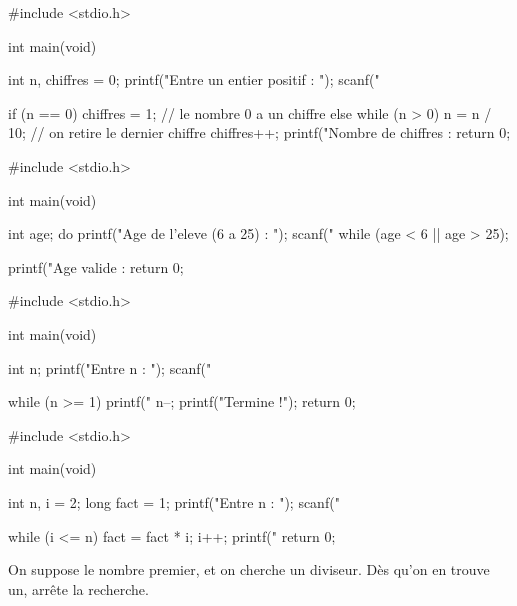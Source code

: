 \begin{codec}
#include <stdio.h>

int main(void) {
    int n, chiffres = 0;
    printf("Entre un entier positif : ");
    scanf("%

    if (n == 0) {
        chiffres = 1;        // le nombre 0 a un chiffre
    } else {
        while (n > 0) {
            n = n / 10;      // on retire le dernier chiffre
            chiffres++;
        }
    }
    printf("Nombre de chiffres : %
    return 0;
}
\end{codec}

\begin{codec}
#include <stdio.h>

int main(void) {
    int age;
    do {
        printf("Age de l'eleve (6 a 25) : ");
        scanf("%
    } while (age < 6 || age > 25);

    printf("Age valide : %
    return 0;
}
\end{codec}

\begin{codec}
#include <stdio.h>

int main(void) {
    int n;
    printf("Entre n : ");
    scanf("%

    while (n >= 1) {
        printf("%
        n--;
    }
    printf("Termine !\n");
    return 0;
}
\end{codec}

\begin{codec}
#include <stdio.h>

int main(void) {
    int n, i = 2;
    long fact = 1;
    printf("Entre n : ");
    scanf("%

    while (i <= n) {
        fact = fact * i;
        i++;
    }
    printf("%
    return 0;
}
\end{codec}

On suppose le nombre premier, et on cherche un diviseur. Dès qu'on en trouve un,
 arrête la recherche.


